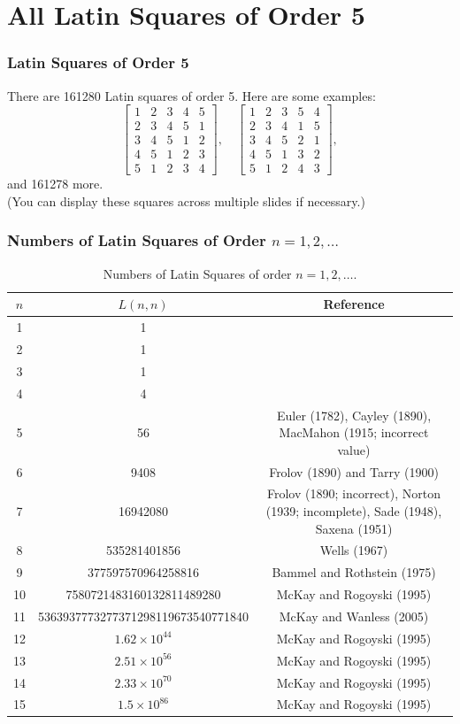 \documentclass{beamer}
\begin{document}
\section{All Latin Squares of Order 5}
\begin{frame}
\frametitle{Latin Squares of Order 5}
There are 161280 Latin squares of order 5. Here are some examples:
\[
\begin{bmatrix}
1 & 2 & 3 & 4 & 5 \\
2 & 3 & 4 & 5 & 1 \\
3 & 4 & 5 & 1 & 2 \\
4 & 5 & 1 & 2 & 3 \\
5 & 1 & 2 & 3 & 4
\end{bmatrix},
\quad
\begin{bmatrix}
1 & 2 & 3 & 5 & 4 \\
2 & 3 & 4 & 1 & 5 \\
3 & 4 & 5 & 2 & 1 \\
4 & 5 & 1 & 3 & 2 \\
5 & 1 & 2 & 4 & 3
\end{bmatrix},
\]
and 161278 more.\\
(You can display these squares across multiple slides if necessary.)
\end{frame}

\begin{frame}
\frametitle{Numbers of Latin Squares of Order $n=1, 2, \dots$}
\begin{table}[ht]
\centering
\begin{tabular}{|c|c|c|}
\hline
$n$ & $L(n,n)$ & Reference \\
\hline
1 & 1 & \\
2 & 1 & \\
3 & 1 & \\
4 & 4 & \\
5 & 56 & Euler (1782), Cayley (1890), MacMahon (1915; incorrect value) \\
6 & 9408 & Frolov (1890) and Tarry (1900) \\
7 & 16942080 & Frolov (1890; incorrect), Norton (1939; incomplete), Sade (1948), Saxena (1951) \\
8 & 535281401856 & Wells (1967) \\
9 & 377597570964258816 & Bammel and Rothstein (1975) \\
10 & 7580721483160132811489280 & McKay and Rogoyski (1995) \\
11 & 5363937773277371298119673540771840 & McKay and Wanless (2005) \\
12 & $1.62 \times 10^{44}$ & McKay and Rogoyski (1995) \\
13 & $2.51 \times 10^{56}$ & McKay and Rogoyski (1995) \\
14 & $2.33 \times 10^{70}$ & McKay and Rogoyski (1995) \\
15 & $1.5 \times 10^{86}$ & McKay and Rogoyski (1995) \\
\hline
\end{tabular}
\caption{Numbers of Latin Squares of order $n=1, 2, \dots$.}
\end{table}
\end{frame}
\end{document}
